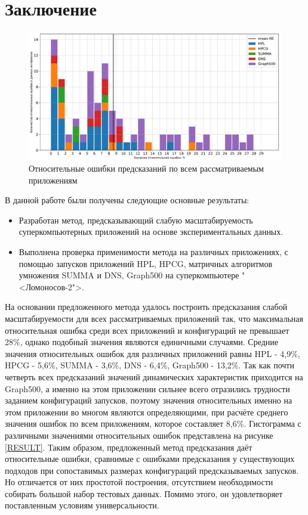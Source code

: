 \section{Заключение}
	\begin{figure}
		\centering
		\includegraphics[width=\textwidth]{./images/RE_graph}
		\caption{Относительные ошибки предсказаний по всем рассматриваемым приложениям}
		\label{RESULT}
	\end{figure}
	В данной работе были получены следующие основные результаты:
	\begin{itemize}
		\item Разработан метод, предсказывающий слабую масштабируемость суперкомпьютерных приложений на основе экспериментальных данных.
		\item Выполнена проверка применимости метода на различных приложениях, с помощью запусков приложений HPL, HPCG, матричных алгоритмов умножения SUMMA и DNS, Graph500 на суперкомпьютере "<Ломоносов-2">.
	\end{itemize}

	На основании предложенного метода удалось построить предсказания слабой масштабируемости для всех рассматриваемых приложений так, что максимальная относительная ошибка среди всех приложений и конфигураций не превышает 28\%, однако подобный значения являются единичными случаями. Средние значения относительных ошибок для различных приложений равны HPL - 4,9\%, HPCG - 5,6\%, SUMMA - 3,6\%, DNS - 6,4\%, Graph500 - 13,2\%. Так как почти четверть всех предсказаний значений динамических характеристик приходится на Graph500, а именно на этом приложении сильнее всего отразились трудности заданием конфигураций запусков, поэтому значения относительных именно на этом приложении во многом являются определяющими, при расчёте среднего значения ошибок по всем приложениям, которое составляет 8,6\%. Гистограмма с различными значениями относительных ошибок представлена на рисунке \eqref{RESULT}. Таким образом, предложенный метод предсказания даёт относительные ошибки, сравнимые с ошибками предсказания у существующих подходов при сопоставимых размерах конфигураций предсказываемых запусков. Но отличается от них простотой построения, отсутствием необходимости собирать большой набор тестовых данных. Помимо этого, он удовлетворяет поставленным условиям универсальности.
	
\clearpage
